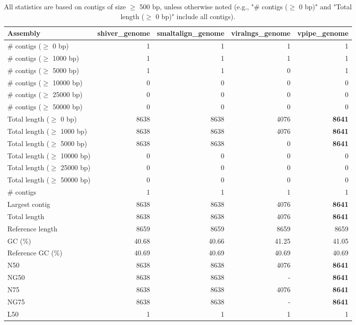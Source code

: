 \documentclass[12pt,a4paper]{article}
\begin{document}
\begin{table}[ht]
\begin{center}
\caption{All statistics are based on contigs of size $\geq$ 500 bp, unless otherwise noted (e.g., "\# contigs ($\geq$ 0 bp)" and "Total length ($\geq$ 0 bp)" include all contigs).}
\begin{tabular}{|l*{4}{|r}|}
\hline
Assembly & shiver\_genome & smaltalign\_genome & viralngs\_genome & vpipe\_genome \\ \hline
\# contigs ($\geq$ 0 bp) & 1 & 1 & 1 & 1 \\ \hline
\# contigs ($\geq$ 1000 bp) & 1 & 1 & 1 & 1 \\ \hline
\# contigs ($\geq$ 5000 bp) & 1 & 1 & 0 & 1 \\ \hline
\# contigs ($\geq$ 10000 bp) & 0 & 0 & 0 & 0 \\ \hline
\# contigs ($\geq$ 25000 bp) & 0 & 0 & 0 & 0 \\ \hline
\# contigs ($\geq$ 50000 bp) & 0 & 0 & 0 & 0 \\ \hline
Total length ($\geq$ 0 bp) & 8638 & 8638 & 4076 & {\bf 8641} \\ \hline
Total length ($\geq$ 1000 bp) & 8638 & 8638 & 4076 & {\bf 8641} \\ \hline
Total length ($\geq$ 5000 bp) & 8638 & 8638 & 0 & {\bf 8641} \\ \hline
Total length ($\geq$ 10000 bp) & 0 & 0 & 0 & 0 \\ \hline
Total length ($\geq$ 25000 bp) & 0 & 0 & 0 & 0 \\ \hline
Total length ($\geq$ 50000 bp) & 0 & 0 & 0 & 0 \\ \hline
\# contigs & 1 & 1 & 1 & 1 \\ \hline
Largest contig & 8638 & 8638 & 4076 & {\bf 8641} \\ \hline
Total length & 8638 & 8638 & 4076 & {\bf 8641} \\ \hline
Reference length & 8659 & 8659 & 8659 & 8659 \\ \hline
GC (\%) & 40.68 & 40.66 & 41.25 & 41.05 \\ \hline
Reference GC (\%) & 40.69 & 40.69 & 40.69 & 40.69 \\ \hline
N50 & 8638 & 8638 & 4076 & {\bf 8641} \\ \hline
NG50 & 8638 & 8638 & - & {\bf 8641} \\ \hline
N75 & 8638 & 8638 & 4076 & {\bf 8641} \\ \hline
NG75 & 8638 & 8638 & - & {\bf 8641} \\ \hline
L50 & 1 & 1 & 1 & 1 \\ \hline

\end{tabular}
\end{center}
\end{table}
\end{document}
